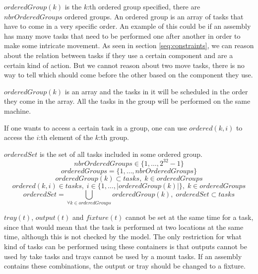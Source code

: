   \noindent $orderedGroup(k)$ is the $k$:th ordered group specified, there are $nbrOrderedGroups$ ordered groups. An ordered group is an array of tasks that have to come in a very specific order. An example of this could be if an assembly has many move tasks that need to be performed one after another in order to make some intricate movement. As seen in section \ref{seq:constraints}, we can reason about the relation between tasks if they use a certain component and are a certain kind of action. But we cannot reason about two move tasks, there is no way to tell which should come before the other based on the component they use. 
  
  $orderedGroup(k)$ is an array and the tasks in it will be scheduled in the order they come in the array. All the tasks in the group will be performed on the same machine.
  
  If one wants to access a certain task in a group, one can use $ordered(k,i)$ to access the $i$:th element of the $k$:th group.
  
  $orderedSet$ is the set of all tasks included in some ordered group.
 \begin{equation}\label{eq:900}
 nbrOrderedGroups \in \{1 , \ldots , 2^{32}-1\}
 \end{equation}
 \begin{equation}\label{eq:9}
 orderedGroups = \{1 , \ldots , nbrOrderedGroups\}
 \end{equation}
 \begin{equation}\label{eq:18}
 orderedGroup(k) \subset tasks, \; k \in orderedGroups
 \end{equation}
 \begin{equation}\label{eq:32}
 ordered(k,i) \in tasks, \; i \in \{1 , \ldots , |orderedGroup(k)|\}, \; k \in orderedGroups
 \end{equation}
 \begin{equation}\label{eq:39}
 orderedSet = \bigcup_{\forall k \in orderedGroups}orderedGroup(k), \; orderedSet \subset tasks
 \end{equation}

  \noindent $tray(t)$, $output(t)$ and $fixture(t)$ cannot be set at the same time for a task, since that would mean that the task is performed at two locations at the same time, although this is not checked by the model. The only restriction for what kind of tasks can be performed using these containers is that outputs cannot be used by take tasks and trays cannot be used by a mount tasks. If an assembly contains these combinations, the output or tray should be changed to a fixture.
 

